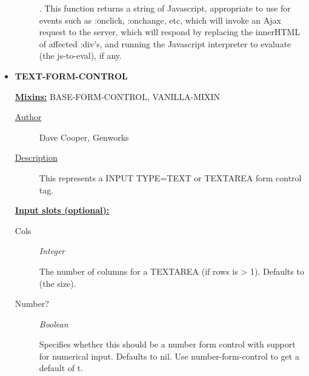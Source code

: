 \documentclass [11pt]{book}
\begin{document}
\begin{itemize}
\begin{description}
.
This function returns a string of Javascript, appropriate to use for events
such as :onclick, :onchange, etc, which will invoke an Ajax request to the
server, which will respond by replacing the innerHTML of affected :div's, and
running the Javascript interpreter to evaluate (the js-to-eval), if any.




\end{description}







\item {}
\label{prim:text-form-control}
\textbf{TEXT-FORM-CONTROL}


\textbf{
\underline{Mixins:}} BASE-FORM-CONTROL, VANILLA-MIXIN





\begin{description}

\item [
\underline{Author}]


Dave Cooper, Genworks



\item [
\underline{Description}]


This represents a INPUT TYPE=TEXT or TEXTAREA form control tag.



\end{description}








\textbf{
\underline{Input slots (optional):}}

\begin{description}

\item [Cols]
\emph{Integer}

 The number of columns for a TEXTAREA (if rows is > 1). Defaults to (the size).




\item [Number?]
\emph{Boolean}

 Specifies whether this should be a number form control with support for numerical input.
Defaults to nil. Use number-form-control to get a default of t.





\end{description}
\end{itemize}
\end{document}
